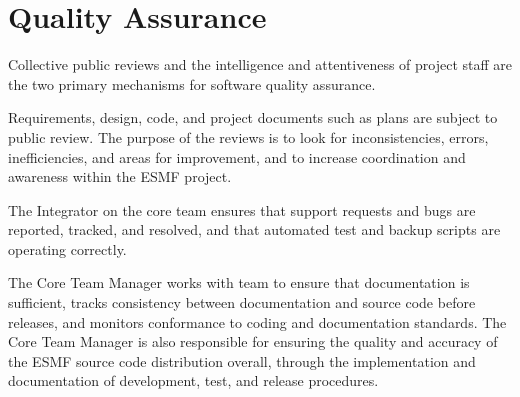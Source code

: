 
\section{Quality Assurance}
\label{sec:qa}

Collective public reviews and the intelligence and attentiveness of
project staff are the two primary mechanisms for software quality assurance.  

Requirements, design, code, and project documents such as plans
are subject to public review.  The purpose of the reviews is
to look for inconsistencies, errors, inefficiencies, and areas
for improvement, and to increase coordination and awareness within
the ESMF project.

The Integrator on the core team ensures that support requests
and bugs are reported, tracked, and resolved, and that automated
test and backup scripts are operating correctly.

The Core Team Manager works with team to ensure that documentation
is sufficient, tracks consistency between documentation and source
code before releases, and monitors conformance to coding and
documentation standards.  The Core Team Manager is also responsible
for ensuring the quality and accuracy of the ESMF source code
distribution overall, through the implementation and documentation of
development, test, and release procedures.









